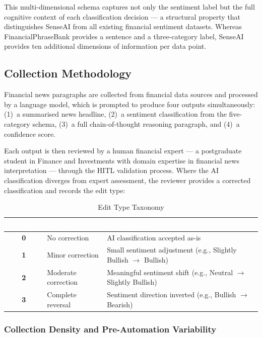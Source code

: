 \documentclass[11pt,a4paper]{article}
\begin{document}
This multi-dimensional schema captures not only the sentiment label but the full
cognitive context of each classification decision --- a structural property that
distinguishes SenseAI from all existing financial sentiment datasets. Whereas
FinancialPhraseBank provides a sentence and a three-category label, SenseAI
provides ten additional dimensions of information per data point.

\subsection{Collection Methodology}

Financial news paragraphs are collected from financial data sources and processed
by a language model, which is prompted to produce four outputs simultaneously:
(1)~a summarised news headline, (2)~a sentiment classification from the five-category
schema, (3)~a full chain-of-thought reasoning paragraph, and (4)~a confidence score.

Each output is then reviewed by a human financial expert --- a postgraduate student
in Finance and Investments with domain expertise in financial news interpretation ---
through the HITL validation process. Where the AI classification diverges from expert
assessment, the reviewer provides a corrected classification and records the edit type:

\begin{table}[H]
\centering
\caption{Edit Type Taxonomy}
\label{tab:edittypes}
\renewcommand{\arraystretch}{1.3}
\begin{tabular}{>{\bfseries}c p{3.5cm} p{7.5cm}}
\toprule
\rowcolor{headerblue}
\textcolor{white}{\textbf{Category}} &
\textcolor{white}{\textbf{Label}} &
\textcolor{white}{\textbf{Description}} \\
\midrule
0 & No correction   & AI classification accepted as-is \\
\rowcolor{rowgray}
1 & Minor correction & Small sentiment adjustment (e.g., Slightly Bullish $\to$ Bullish) \\
2 & Moderate correction & Meaningful sentiment shift (e.g., Neutral $\to$ Slightly Bullish) \\
\rowcolor{rowgray}
3 & Complete reversal & Sentiment direction inverted (e.g., Bullish $\to$ Bearish) \\
\bottomrule
\end{tabular}
\end{table}

\subsubsection{Collection Density and Pre-Automation Variability}
\end{document}
